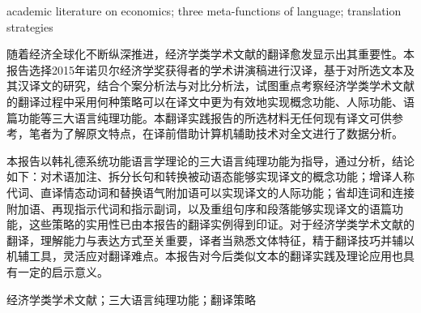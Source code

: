 \vspace{1em}
\textbf{\heiti{}}
academic literature on economics; three meta-functions of language; translation strategies

\newpage
{}
\vspace*{2em}
\begin{spacing}{0.95}
	\centering
	\sanhao\textbf{}
	\vspace{2mm}
	\ifx\subtitle\undefined\else
	\begin{spacing}{1.2}
		\sihao\selectfont{\textmd{\kaishu{-----}\rmfamily\textbf{\ensubtitle}}}
	\end{spacing}
	\fi
\end{spacing}
\vspace{1em}
\setlength{\parskip}{0em}

随着经济全球化不断纵深推进，经济学类学术文献的翻译愈发显示出其重要性。本报告选择2015年诺贝尔经济学奖获得者的学术讲演稿进行汉译，基于对所选文本及其汉译文的研究，结合个案分析法与对比分析法，试图重点考察经济学类学术文献的翻译过程中采用何种策略可以在译文中更为有效地实现概念功能、人际功能、语篇功能等三大语言纯理功能。本翻译实践报告的所选材料无任何现有译文可供参考，笔者为了解原文特点，在译前借助计算机辅助技术对全文进行了数据分析。
\par
本报告以韩礼德系统功能语言学理论的三大语言纯理功能为指导，通过分析，结论如下：对术语加注、拆分长句和转换被动语态能够实现译文的概念功能；增译人称代词、直译情态动词和替换语气附加语可以实现译文的人际功能；省却连词和连接附加语、再现指示代词和指示副词，以及重组句序和段落能够实现译文的语篇功能，这些策略的实用性已由本报告的翻译实例得到印证。对于经济学类学术文献的翻译，理解能力与表达方式至关重要，译者当熟悉文体特征，精于翻译技巧并辅以机辅工具，灵活应对翻译难点。本报告对今后类似文本的翻译实践及理论应用也具有一定的启示意义。
\par

\vspace{1em}
\textbf{\rmfamily{}}
经济学类学术文献；三大语言纯理功能；翻译策略


